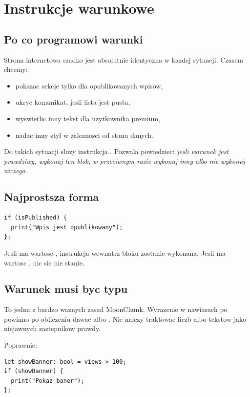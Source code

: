 \chapter{Instrukcje warunkowe}

\section{Po co programowi warunki}
Strona internetowa rzadko jest absolutnie identyczna w kazdej sytuacji. Czasem chcemy:

\begin{itemize}
  \item pokazac sekcje tylko dla opublikowanych wpisow,
  \item ukryc komunikat, jesli lista jest pusta,
  \item wyswietlic inny tekst dla uzytkownika premium,
  \item nadac inny styl w zaleznosci od stanu danych.
\end{itemize}

Do takich sytuacji sluzy instrukcja . Pozwala powiedziec:
\emph{jesli warunek jest prawdziwy, wykonaj ten blok; w przeciwnym razie wykonaj inny
albo nie wykonuj niczego}.

\section{Najprostsza forma }
\begin{lstlisting}[style=moonchunk,caption={Podstawowy warunek if}]
if (isPublished) {
  print("Wpis jest opublikowany");
};
\end{lstlisting}

Jesli  ma wartosc , instrukcja wewnatrz bloku zostanie wykonana.
Jesli ma wartosc , nic sie nie stanie.

\section{Warunek musi byc typu }
To jedna z bardzo waznych zasad MoonChunk. Wyrazenie w nawiasach po  powinno
po obliczeniu dawac  albo . Nie nalezy traktowac liczb albo tekstow
jako niejawnych zastepnikow prawdy.

Poprawnie:

\begin{lstlisting}[style=moonchunk,caption={Poprawny warunek logiczny}]
let showBanner: bool = views > 100;
if (showBanner) {
  print("Pokaz baner");
};
\end{lstlisting}

